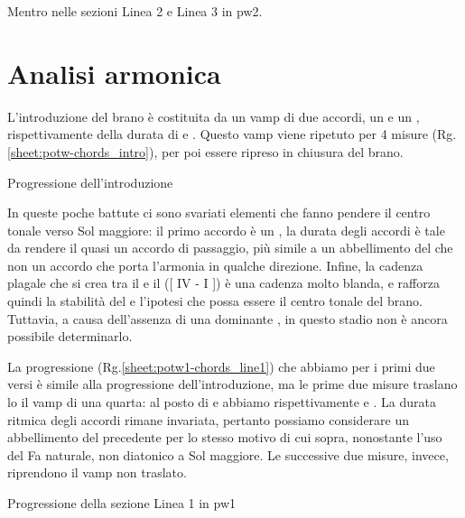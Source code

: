 \documentclass[class=book, crop=false, oneside, 12pt]{standalone}
\begin{document}
    \begin{sheet}{Mentro nelle sezioni Linea 2 e Linea 3 in \acrshort{pw2}.}
        \label{sheet:potw2-rhythm_line23}
    \end{sheet}

    
    \section{Analisi armonica}
    \label{sec:03-harmony}
    L'introduzione del brano è costituita da un vamp di due accordi, un  e un {,} rispettivamente della durata di  e . Questo vamp viene ripetuto per 4 misure (Rg.\ref{sheet:potw-chords_intro}), per poi essere ripreso in chiusura del brano. 
    \begin{sheet}{Progressione dell'introduzione}
        \label{sheet:potw-chords_intro}
    \end{sheet}
    
    In queste poche battute ci sono svariati elementi che fanno pendere il centro tonale verso Sol maggiore: il primo accordo è un , la durata degli accordi è tale da rendere il  quasi un accordo di passaggio, più simile a un abbellimento del  che non un accordo che porta l'armonia in qualche direzione. Infine, la cadenza plagale che si crea tra il  e il  ([ IV - I ]) è una cadenza molto blanda, e rafforza quindi la stabilità del  e l'ipotesi che possa essere il centro tonale del brano. Tuttavia, a causa dell'assenza di una dominante , in questo stadio non è ancora possibile determinarlo.

    La progressione (Rg.\ref{sheet:potw1-chords_line1}) che abbiamo per i primi due versi  è simile alla progressione dell'introduzione, ma le prime due misure traslano lo il vamp di una quarta: al posto di  e  abbiamo rispettivamente  e . La durata ritmica degli accordi rimane invariata, pertanto possiamo considerare  un abbellimento del precedente  per lo stesso motivo di cui sopra, nonostante l'uso del Fa naturale, non diatonico a Sol maggiore. Le successive due misure, invece, riprendono il vamp non traslato.

    
    \begin{sheet}{Progressione della sezione Linea 1 in \acrshort{pw1}}
        \label{sheet:potw1-chords_line1}
    \end{sheet}
    
\end{document}
